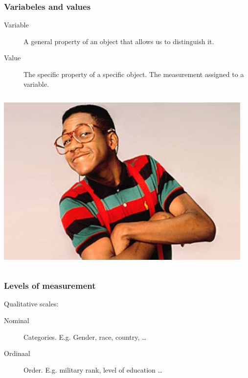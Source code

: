 \documentclass{beamer}
\begin{document}
\begin{frame}
  \frametitle{Variabeles and values}

  \begin{description}
    \item[Variable] A general property of an object that allows us to distinguish it.
    \item[Value] The specific property of a specific object. The measurement assigned to a variable.
  \end{description}

  \vspace{1cm}

  \begin{columns}[c]
    \includegraphics[width=\textwidth]{img/les1-07}

    \\
    \vspace{.5cm}
    \\
    \vspace{.5cm}

  \end{columns}
\end{frame}

\begin{frame}
  \frametitle{Levels of measurement}

  Qualitative scales:

  \begin{description}
    \item[Nominal] Categories. E.g. Gender, race, country, \ldots
    \item[Ordinaal] Order. E.g. military rank, level of education \ldots
  \end{description}

\end{frame}
\end{document}
